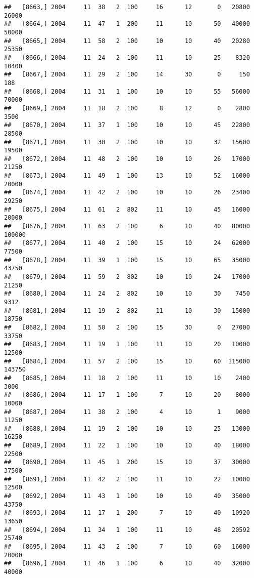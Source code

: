 \documentclass{article}\usepackage[]{graphicx}\usepackage[]{color}
\makeatletter
\newenvironment{kframe}{%
 \def\at@end@of@kframe{}%
 \ifinner\ifhmode%
  \def\at@end@of@kframe{\end{minipage}}%
  \begin{minipage}{\columnwidth}%
 \fi\fi%
 \def\FrameCommand##1{\hskip\@totalleftmargin \hskip-\fboxsep
 \colorbox{shadecolor}{##1}\hskip-\fboxsep
     \hskip-\linewidth \hskip-\@totalleftmargin \hskip\columnwidth}%
 \MakeFramed {\advance\hsize-\width
   \@totalleftmargin\z@ \linewidth\hsize
   \@setminipage}}%
 {\par\unskip\endMakeFramed%
 \at@end@of@kframe}
\newenvironment{knitrout}{}{} %
\makeatother
\begin{document}
\begin{knitrout}
\begin{kframe}
\begin{verbatim}
##   [8663,] 2004     11  38   2  100     16      12       0   20800   26000
##   [8664,] 2004     11  47   1  200     11      10      50   40000   50000
##   [8665,] 2004     11  58   2  100     10      10      40   20280   25350
##   [8666,] 2004     11  24   2  100     11      10      25    8320   10400
##   [8667,] 2004     11  29   2  100     14      30       0     150     188
##   [8668,] 2004     11  31   1  100     10      10      55   56000   70000
##   [8669,] 2004     11  18   2  100      8      12       0    2800    3500
##   [8670,] 2004     11  37   1  100     10      10      45   22800   28500
##   [8671,] 2004     11  30   2  100     10      10      32   15600   19500
##   [8672,] 2004     11  48   2  100     10      10      26   17000   21250
##   [8673,] 2004     11  49   1  100     13      10      52   16000   20000
##   [8674,] 2004     11  42   2  100     10      10      26   23400   29250
##   [8675,] 2004     11  61   2  802     11      10      45   16000   20000
##   [8676,] 2004     11  63   2  100      6      10      40   80000  100000
##   [8677,] 2004     11  40   2  100     15      10      24   62000   77500
##   [8678,] 2004     11  39   1  100     15      10      65   35000   43750
##   [8679,] 2004     11  59   2  802     10      10      24   17000   21250
##   [8680,] 2004     11  24   2  802     10      10      30    7450    9312
##   [8681,] 2004     11  19   2  802     11      10      30   15000   18750
##   [8682,] 2004     11  50   2  100     15      30       0   27000   33750
##   [8683,] 2004     11  19   1  100     11      10      20   10000   12500
##   [8684,] 2004     11  57   2  100     15      10      60  115000  143750
##   [8685,] 2004     11  18   2  100     11      10      10    2400    3000
##   [8686,] 2004     11  17   1  100      7      10      20    8000   10000
##   [8687,] 2004     11  38   2  100      4      10       1    9000   11250
##   [8688,] 2004     11  19   2  100     10      10      25   13000   16250
##   [8689,] 2004     11  22   1  100     10      10      40   18000   22500
##   [8690,] 2004     11  45   1  200     15      10      37   30000   37500
##   [8691,] 2004     11  42   2  100     11      10      22   10000   12500
##   [8692,] 2004     11  43   1  100     10      10      40   35000   43750
##   [8693,] 2004     11  17   1  200      7      10      40   10920   13650
##   [8694,] 2004     11  34   1  100     11      10      48   20592   25740
##   [8695,] 2004     11  43   2  100      7      10      60   16000   20000
##   [8696,] 2004     11  46   1  100      6      10      40   32000   40000

\end{verbatim}
\end{kframe}
\end{knitrout}
\end{document}
